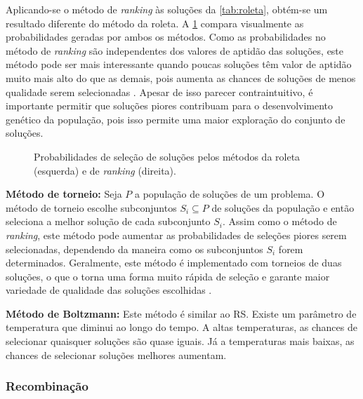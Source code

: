 Aplicando-se o método de \emph{ranking} às soluções da \cref{tab:roleta}, obtém-se um resultado diferente do método da roleta. A \cref{fig:roleta e ranking} compara visualmente as probabilidades geradas por ambos os métodos. Como as probabilidades no método de \emph{ranking} são independentes dos valores de aptidão das soluções, este método pode ser mais interessante quando poucas soluções têm valor de aptidão muito mais alto do que as demais, pois aumenta as chances de soluções de menos qualidade serem selecionadas \cite{YADAV2017}. Apesar de isso parecer contraintuitivo, é importante permitir que soluções piores contribuam para o desenvolvimento genético da população, pois isso permite uma maior exploração do conjunto de soluções.

\begin{figure}[ht]
    \centering
    \caption{Probabilidades de seleção de soluções pelos métodos da roleta (esquerda) e de \emph{ranking} (direita).}
    \label{fig:roleta e ranking}
\end{figure}

\textbf{Método de torneio:} Seja $P$ a população de soluções de um problema. O método de torneio escolhe subconjuntos $S_i \subseteq P$  de soluções da população e então seleciona a melhor solução de cada subconjunto $S_i$. Assim como o método de \emph{ranking}, este método pode aumentar as probabilidades de seleções piores serem selecionadas, dependendo da maneira como os subconjuntos $S_i$ forem determinados. Geralmente, este método é implementado com torneios de duas soluções, o que o torna uma forma muito rápida de seleção e garante maior variedade de qualidade das soluções escolhidas \cite{SHUKLA2015}.

\textbf{Método de Boltzmann:} Este método é similar ao RS. Existe um parâmetro de temperatura que diminui ao longo do tempo. A altas temperaturas, as chances de selecionar quaisquer soluções são quase iguais. Já a temperaturas mais baixas, as chances de selecionar soluções melhores aumentam.

\subsubsection{Recombinação}

